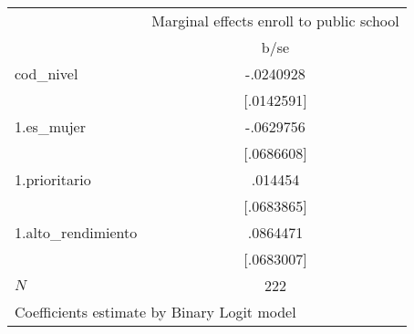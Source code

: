 \begin{tabular}{l*{1}{c}}
            &\multicolumn{1}{c}{Marginal effects enroll to public school}\\
            &        b/se\\
cod\_nivel   &   -.0240928\\
            &  [.0142591]\\
1.es\_mujer  &   -.0629756\\
            &  [.0686608]\\
1.prioritario&     .014454\\
            &  [.0683865]\\
1.alto\_rendimiento&    .0864471\\
            &  [.0683007]\\
\(N\)       &         222\\
\multicolumn{2}{l}{\footnotesize Coefficients estimate by Binary Logit model}\\
\end{tabular}
